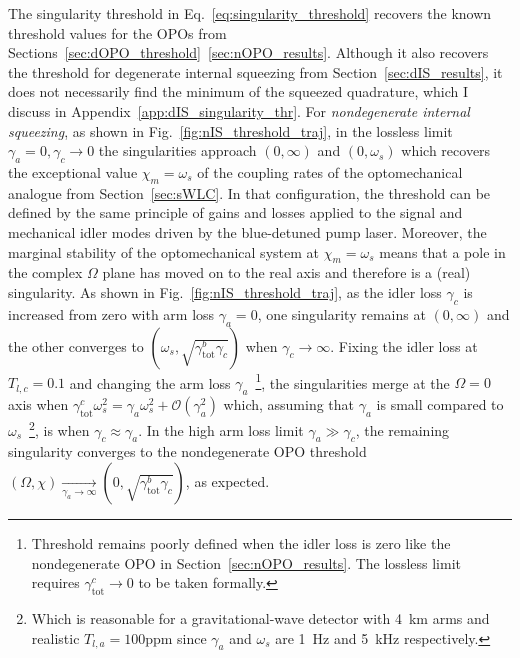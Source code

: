 The singularity threshold in Eq.~\ref{eq:singularity_threshold} recovers the known threshold values for the OPOs from Sections~\ref{sec:dOPO_threshold}~\ref{sec:nOPO_results}. Although it also recovers the threshold for degenerate internal squeezing from Section~\ref{sec:dIS_results}, it does not necessarily find the minimum of the squeezed quadrature, which I discuss in Appendix~\ref{app:dIS_singularity_thr}.
For \emph{nondegenerate internal squeezing}, as shown in Fig.~\ref{fig:nIS_threshold_traj}, in the lossless limit $\gamma_a=0,\gamma_c\rightarrow0$ the singularities approach $(0,\infty)$ and $(0,\omega_s)$ which recovers the exceptional value $\chi_m=\omega_s$ of the coupling rates of the optomechanical analogue from Section~\ref{sec:sWLC}. In that configuration, the threshold can be defined by the same principle of gains and losses applied to the signal and mechanical idler modes driven by the blue-detuned pump laser. Moreover, the marginal stability of the optomechanical system at $\chi_m=\omega_s$ means that a pole in the complex $\Omega$ plane has moved on to the real axis and therefore is a (real) singularity. As shown in Fig.~\ref{fig:nIS_threshold_traj}, as the idler loss $\gamma_c$ is increased from zero with arm loss $\gamma_a=0$, one singularity remains at $(0,\infty)$ and the other converges to $(\omega_s,\sqrt{\gamma^b_\text{tot}\gamma_c})$ when $\gamma_c\rightarrow\infty$. Fixing the idler loss at $T_{l,c}=0.1$ and changing the arm loss $\gamma_a$~\footnote{Threshold remains poorly defined when the idler loss is zero like the nondegenerate OPO in Section~\ref{sec:nOPO_results}. The lossless limit requires $\gamma^c_\text{tot}\rightarrow0$ to be taken formally.}, the singularities merge at the $\Omega=0$ axis when $\gamma^c_\text{tot}\omega_s^2=\gamma_a\omega_s^2+\mathcal{O}(\gamma_a^2)$ which, assuming that $\gamma_a$ is small compared to $\omega_s$~\footnote{Which is reasonable for a gravitational-wave detector with 4~km arms and realistic $T_{l,a}=100\text{ppm}$ since $\gamma_a$ and $\omega_s$ are 1~Hz and 5~kHz respectively.}, is when $\gamma_c\approx\gamma_a$. In the high arm loss limit $\gamma_a\gg\gamma_c$, the remaining singularity converges to the nondegenerate OPO threshold $(\Omega,\chi)\xrightarrow[\gamma_a\rightarrow\infty]{}(0,\sqrt{\gamma^b_\mathrm{tot}\gamma_c})$, as expected.

